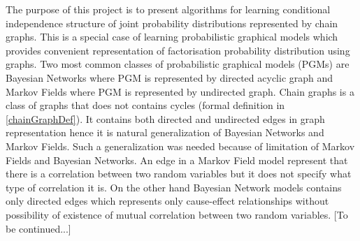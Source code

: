 

The purpose of this project is to present algorithms for learning conditional independence structure of joint probability distributions represented by chain graphs. This is a special case of learning probabilistic graphical models which provides convenient representation of factorisation probability distribution using graphs.
Two most common classes of probabilistic graphical models (PGMs) are Bayesian Networks where PGM is represented by directed acyclic graph and Markov Fields where PGM is represented by undirected graph. Chain graphs is a class of graphs that does not contains cycles (formal definition in \ref{chainGraphDef}). It contains both directed and undirected edges in graph representation hence it is natural generalization of Bayesian Networks and Markov Fields.
Such a generalization was needed because of limitation of Markov Fields and Bayesian Networks. An edge in a Markov Field model represent that there is a correlation between two random variables but it does not specify what type of correlation
it is. On the other hand Bayesian Network models contains only directed edges which represents only cause-effect relationships without possibility of existence of mutual correlation between two random variables.
[To be continued...]
